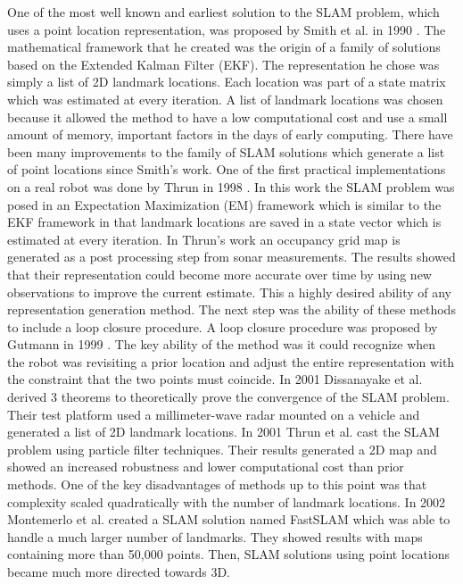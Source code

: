 One of the most well known and earliest solution to the SLAM problem, which
uses a point location representation, was proposed by Smith et al. in 1990
\cite{Smith1990}. The mathematical framework that he created was the origin
of a family of solutions based on the Extended Kalman Filter (EKF). The
representation he chose was simply a list of 2D landmark locations. Each
location was part of a state matrix which was estimated at every iteration.
A list of landmark locations was chosen because it allowed the method to
have a low computational cost and use a small amount of memory, important
factors in the days of early computing. There have been many improvements
to the family of SLAM solutions which generate a list of point locations
since Smith's work. One of the first practical implementations on a real
robot was done by Thrun in 1998 \cite{Thrun1998}. In this work the SLAM
problem was posed in an Expectation Maximization (EM) framework which is
similar to the EKF framework in that landmark locations are saved
in a state vector which is estimated at every iteration. In Thrun's work an
occupancy grid map is generated as a post processing step from sonar
measurements. The results showed that their representation could become
more accurate over time by using new observations to improve the current
estimate. This a highly desired ability of any representation generation
method. The next step was the ability of these methods to include a loop
closure procedure. A loop closure procedure was proposed by Gutmann in 1999
\cite{Gutmann1999}. The key ability of the method was it could recognize
when the robot was revisiting a prior location and adjust the entire
representation with the constraint that the two points must coincide. In
2001 Dissanayake et al. \cite{Dissanayake2001} derived 3 theorems to
theoretically prove the convergence of the SLAM problem. Their test
platform used a millimeter-wave radar mounted on a vehicle and generated a
list of 2D landmark locations. In 2001 Thrun et al. \cite{Thrun2001} cast
the SLAM problem using particle filter techniques. Their results generated
a 2D map and showed an increased robustness and lower computational cost
than prior methods. One of the key disadvantages of methods up to this
point was that complexity scaled quadratically with the number of landmark
locations.  In 2002 Montemerlo et al. \cite{Montemerlo2002} created a SLAM
solution named FastSLAM which was able to handle a much larger number of
landmarks. They showed results with maps containing more than 50,000
points. Then, SLAM solutions using point locations became much more
directed towards 3D.

